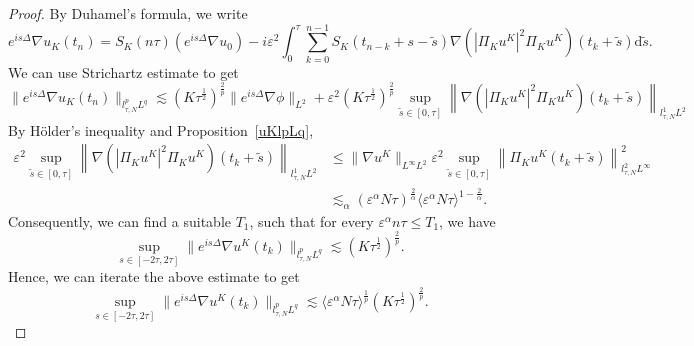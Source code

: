 \documentclass[10pt,a4paper]{article}
\begin{document}
  \begin{proof}
    By Duhamel's formula, we write
    \begin{equation}
      e^{is\Delta} \nabla u_K(t_n) = S_K(n\tau) (e^{is\Delta} \nabla u_0) 
      -i\varepsilon^2 \int_{0}^{\tau} \sum_{k=0}^{n-1} S_K(t_{n-k}+s-\tilde{s}) 
      \nabla \left(|\Pi_K u^K|^2 \Pi_K u^K\right)(t_k+\tilde{s}) \mathrm{d} \tilde{s}.
    \end{equation}
    We can use Strichartz estimate to get %
    \[ \|e^{is\Delta} \nabla u_K(t_n)\|_{l^p_{\tau,N}L^q} \lesssim
      (K\tau^{\frac{1}{2}})^{\frac{2}{p}}\|e^{is\Delta}\nabla \phi\|_{L^2} 
      + \varepsilon^2
      (K\tau^{\frac{1}{2}})^{\frac{2}{p}}\sup_{\tilde{s}\in[0,\tau]}\left\| 
      \nabla \left(|\Pi_K u^K|^2 \Pi_K u^K\right)(t_k+\tilde{s}) \right\|_{l^1_{\tau,N}L^2} \]
    By H\"older's inequality and Proposition~\ref{uKlpLq},
    \begin{align}
      \varepsilon^2 \sup_{\tilde{s}\in[0,\tau]}\left\| 
      \nabla \left(|\Pi_K u^K|^2 \Pi_K u^K\right)(t_k+\tilde{s}) \right\|_{l^1_{\tau,N}L^2} 
      &\leq \|\nabla u^K\|_{L^{\infty} L^2} \varepsilon^2 \sup_{\tilde{s} \in [0,\tau]} 
      \left\|\Pi_K u^K(t_k+\tilde{s})\right\|_{l_{\tau, N}^2 L^{\infty}}^2 \\
      & \lesssim_{\alpha}  {(\varepsilon^\alpha N\tau)}^\frac2\alpha 
      {\langle\varepsilon^\alpha N\tau\rangle}^{1-\frac2\alpha}. 
    \end{align}
    Consequently, we can find a suitable \(T_1\), such that for every \(
    \varepsilon^\alpha n \tau \leq T_1 \), we have 
    \[ 
      \sup_{s\in[-2\tau,2\tau]}\|e^{is\Delta}\nabla u^K(t_k)\|_{l^p_{\tau,N}L^q}
      \lesssim (K\tau^\frac12)^\frac2p.
    \]
    Hence, we can iterate the above estimate to get 
    \[ 
      \sup_{s\in[-2\tau,2\tau]}\|e^{is\Delta}\nabla u^K(t_k)\|_{l^p_{\tau,N}L^q}
      \lesssim \langle\varepsilon^\alpha N\tau\rangle^\frac1p (K\tau^\frac12)^\frac2p.
    \]
  \end{proof}
\end{document}
